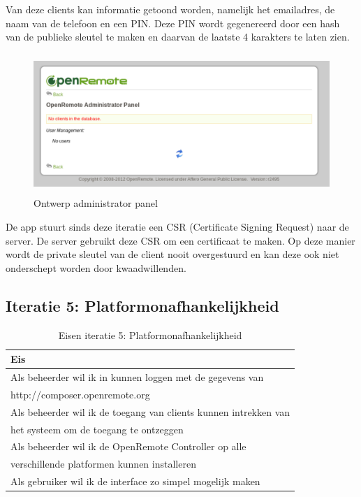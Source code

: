 \documentclass[]{article}
\begin{document}
Van deze clients kan informatie getoond worden, namelijk het emailadres,
de naam van de telefoon en een PIN. Deze PIN wordt gegenereerd door een
hash van de publieke sleutel te maken en daarvan de laatste 4 karakters te
laten zien.

\begin{figure}[h!]
  \centering
    \includegraphics[height=150pt,keepaspectratio]{adminv1.pdf}
  \caption{Ontwerp administrator panel}
  \label{adminv1}
\end{figure}

De app stuurt sinds deze iteratie een CSR (Certificate Signing Request) naar de server. De server
gebruikt deze CSR om een certificaat te maken. Op deze manier wordt de private
sleutel van de client nooit overgestuurd en kan deze ook niet onderschept
worden door kwaadwillenden.

\subsection{Iteratie 5: Platformonafhankelijkheid}
\begin{table}[htpb]
  \caption{Eisen iteratie 5: Platformonafhankelijkheid}
  \begin{center}
    \begin{tabular}{|| l ||}\hline
        Eis                                                              \\\hline\hline
        Als beheerder wil ik in kunnen loggen met de gegevens van        \\
        http://composer.openremote.org                                   \\\hline
        Als beheerder wil ik de toegang van clients kunnen intrekken van \\ 
        het systeem om de toegang te ontzeggen                           \\\hline
        Als beheerder wil ik de OpenRemote Controller op alle            \\ 
        verschillende platformen kunnen installeren                      \\\hline
        Als gebruiker wil ik de interface zo simpel mogelijk maken       \\\hline
    \end{tabular}
  \end{center}
\end{table}
\end{document}
